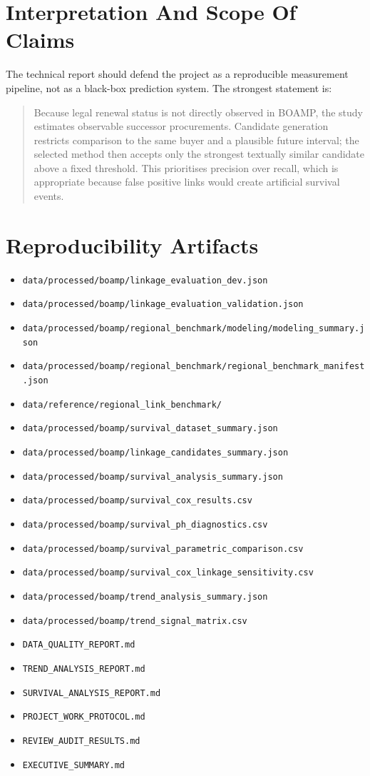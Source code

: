 \documentclass[11pt,a4paper]{article}
\newcommand{\pathcode}[1]{\texttt{\small #1}}
\begin{document}
\section{Interpretation And Scope Of Claims}
The technical report should defend the project as a reproducible measurement
pipeline, not as a black-box prediction system. The strongest statement is:
\begin{quote}
Because legal renewal status is not directly observed in BOAMP, the study
estimates observable successor procurements. Candidate generation restricts
comparison to the same buyer and a plausible future interval; the selected
method then accepts only the strongest textually similar candidate above a fixed
threshold. This prioritises precision over recall, which is appropriate because
false positive links would create artificial survival events.
\end{quote}

\section{Reproducibility Artifacts}
\begin{itemize}
\item \pathcode{data/processed/boamp/linkage\_evaluation\_dev.json}
\item \pathcode{data/processed/boamp/linkage\_evaluation\_validation.json}
\item \pathcode{data/processed/boamp/regional\_benchmark/modeling/modeling\_summary.json}
\item \pathcode{data/processed/boamp/regional\_benchmark/regional\_benchmark\_manifest.json}
\item \pathcode{data/reference/regional\_link\_benchmark/}
\item \pathcode{data/processed/boamp/survival\_dataset\_summary.json}
\item \pathcode{data/processed/boamp/linkage\_candidates\_summary.json}
\item \pathcode{data/processed/boamp/survival\_analysis\_summary.json}
\item \pathcode{data/processed/boamp/survival\_cox\_results.csv}
\item \pathcode{data/processed/boamp/survival\_ph\_diagnostics.csv}
\item \pathcode{data/processed/boamp/survival\_parametric\_comparison.csv}
\item \pathcode{data/processed/boamp/survival\_cox\_linkage\_sensitivity.csv}
\item \pathcode{data/processed/boamp/trend\_analysis\_summary.json}
\item \pathcode{data/processed/boamp/trend\_signal\_matrix.csv}
\item \pathcode{DATA\_QUALITY\_REPORT.md}
\item \pathcode{TREND\_ANALYSIS\_REPORT.md}
\item \pathcode{SURVIVAL\_ANALYSIS\_REPORT.md}
\item \pathcode{PROJECT\_WORK\_PROTOCOL.md}
\item \pathcode{REVIEW\_AUDIT\_RESULTS.md}
\item \pathcode{EXECUTIVE\_SUMMARY.md}
\end{itemize}
\end{document}

